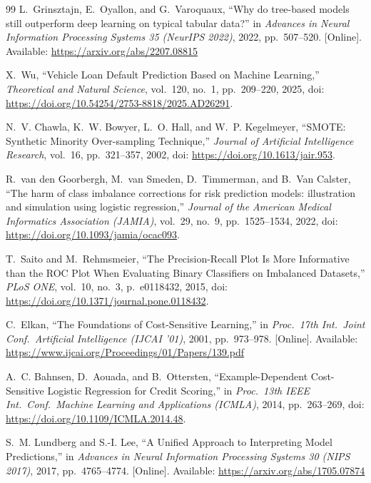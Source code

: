 {\begin{thebibliography}{99}
L.~Grinsztajn, E.~Oyallon, and G.~Varoquaux, ``Why do tree-based models still outperform deep learning on typical tabular data?'' in \textit{Advances in Neural Information Processing Systems 35 (NeurIPS 2022)}, 2022, pp.~507--520. [Online]. Available: \url{https://arxiv.org/abs/2207.08815}

X.~Wu, ``Vehicle Loan Default Prediction Based on Machine Learning,'' \textit{Theoretical and Natural Science}, vol.~120, no.~1, pp.~209--220, 2025, doi: \url{https://doi.org/10.54254/2753-8818/2025.AD26291}.

N.~V. Chawla, K.~W. Bowyer, L.~O. Hall, and W.~P. Kegelmeyer, ``SMOTE: Synthetic Minority Over-sampling Technique,'' \textit{Journal of Artificial Intelligence Research}, vol.~16, pp.~321--357, 2002, doi: \url{https://doi.org/10.1613/jair.953}.

R.~van den Goorbergh, M.~van Smeden, D.~Timmerman, and B.~Van Calster, ``The harm of class imbalance corrections for risk prediction models: illustration and simulation using logistic regression,'' \textit{Journal of the American Medical Informatics Association (JAMIA)}, vol.~29, no.~9, pp.~1525--1534, 2022, doi: \url{https://doi.org/10.1093/jamia/ocac093}.

T.~Saito and M.~Rehmsmeier, ``The Precision-Recall Plot Is More Informative than the ROC Plot When Evaluating Binary Classifiers on Imbalanced Datasets,'' \textit{PLoS ONE}, vol.~10, no.~3, p.~e0118432, 2015, doi: \url{https://doi.org/10.1371/journal.pone.0118432}.

C.~Elkan, ``The Foundations of Cost-Sensitive Learning,'' in \textit{Proc.\ 17th Int.\ Joint Conf.\ Artificial Intelligence (IJCAI '01)}, 2001, pp.~973--978. [Online]. Available: \url{https://www.ijcai.org/Proceedings/01/Papers/139.pdf}

A.~C. Bahnsen, D.~Aouada, and B.~Ottersten, ``Example-Dependent Cost-Sensitive Logistic Regression for Credit Scoring,'' in \textit{Proc.\ 13th IEEE Int.\ Conf.\ Machine Learning and Applications (ICMLA)}, 2014, pp.~263--269, doi: \url{https://doi.org/10.1109/ICMLA.2014.48}.

S.~M. Lundberg and S.-I. Lee, ``A Unified Approach to Interpreting Model Predictions,'' in \textit{Advances in Neural Information Processing Systems 30 (NIPS 2017)}, 2017, pp.~4765--4774. [Online]. Available: \url{https://arxiv.org/abs/1705.07874}


\end{thebibliography}}
